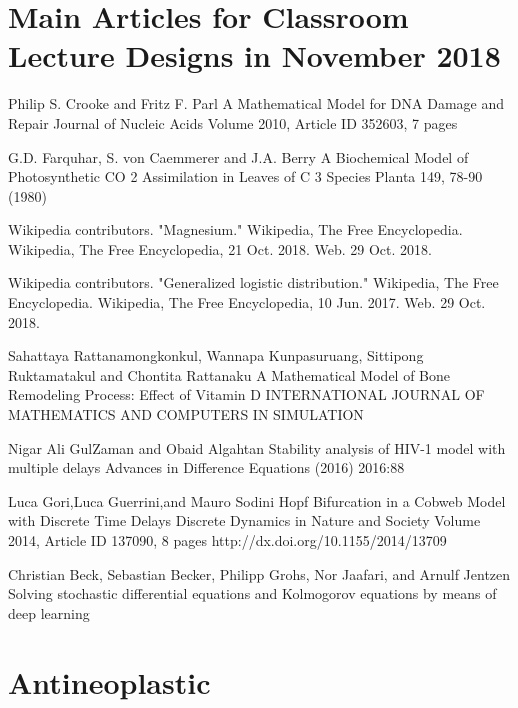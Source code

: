 

\begin{thebibliography}{00}
\small

\section{Main Articles for Classroom Lecture Designs in November 2018}
 
Philip S. Crooke and Fritz F. Parl
\newblock A Mathematical Model for DNA Damage and Repair
\newblock Journal of Nucleic Acids Volume 2010, Article ID 352603, 7 pages

 G.D. Farquhar, S. von Caemmerer and J.A. Berry  
\newblock A Biochemical Model of Photosynthetic CO 2 Assimilation in Leaves of C 3 Species 
\newblock Planta 149, 78-90 (1980) 

 Wikipedia contributors. 
\newblock "Magnesium." 
\newblock Wikipedia, The Free Encyclopedia. Wikipedia, The Free Encyclopedia, 21 Oct. 2018. Web. 29 Oct. 2018. 

Wikipedia contributors. 
\newblock "Generalized logistic distribution." 
\newblock Wikipedia, The Free Encyclopedia. Wikipedia, The Free Encyclopedia, 10 Jun. 2017. Web. 29 Oct. 2018. 

Sahattaya Rattanamongkonkul,  Wannapa Kunpasuruang, Sittipong Ruktamatakul and Chontita Rattanaku
\newblock A Mathematical Model of Bone Remodeling Process:  Effect of Vitamin D
\newblock INTERNATIONAL JOURNAL OF MATHEMATICS AND COMPUTERS IN SIMULATION

Nigar Ali GulZaman and Obaid Algahtan
\newblock Stability analysis of HIV-1 model with multiple delays
\newblock Advances in Difference Equations (2016) 2016:88 

 Luca Gori,Luca Guerrini,and Mauro Sodini
\newblock Hopf Bifurcation in a Cobweb Model with Discrete Time Delays
\newblock Discrete Dynamics in Nature and Society Volume 2014, Article ID 137090, 8 pages http://dx.doi.org/10.1155/2014/13709

 Christian Beck, Sebastian Becker, Philipp Grohs, Nor Jaafari, and Arnulf Jentzen
\newblock Solving stochastic differential equations and Kolmogorov equations by means of deep learning

\section{Antineoplastic}


\end{thebibliography}
